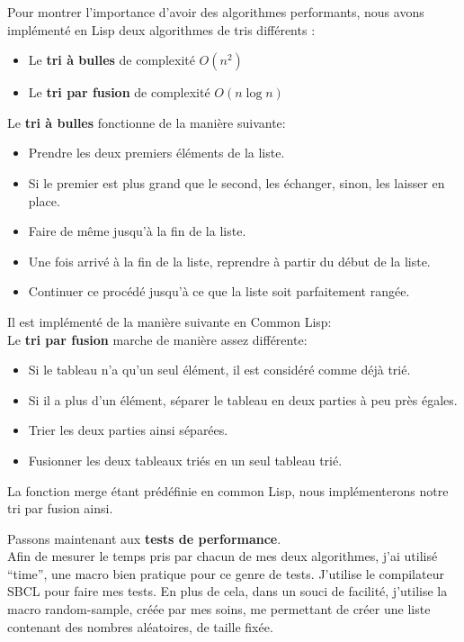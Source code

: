 \documentclass[a4paper, 12pt]{article}
\numberwithin{equation}{subsection}
\begin{document}
Pour montrer l'importance d'avoir des algorithmes performants, nous avons implémenté en Lisp deux algorithmes de tris différents : \\[0.2cm]
\begin{itemize}
  \item Le {\bf tri à bulles} de complexité {\bf $O(n^{2})$}
  \item Le {\bf tri par fusion} de complexité {\bf $O(n\log{n})$}\\
\end{itemize}
Le {\bf tri à bulles} fonctionne de la manière suivante:
\begin{itemize}
  \item Prendre les deux premiers éléments de la liste.
  \item Si le premier est plus grand que le second, les échanger, sinon, les laisser en place.
  \item Faire de même jusqu'à la fin de la liste.
  \item Une fois arrivé à la fin de la liste, reprendre à partir du début de la liste.
  \item Continuer ce procédé jusqu'à ce que la liste soit parfaitement rangée.\\[0.2cm]
\end{itemize}
Il est implémenté de la manière suivante en Common Lisp: \\[0.2cm]

Le {\bf tri par fusion} marche de manière assez différente:
\begin{itemize}
  \item Si le tableau n'a qu'un seul élément, il est considéré comme déjà trié.
  \item Si il a plus d'un élément, séparer le tableau en deux parties à peu près égales.
  \item Trier les deux parties ainsi séparées.
  \item Fusionner les deux tableaux triés en un seul tableau trié. \\[0.2cm]
\end{itemize}
La fonction merge étant prédéfinie en common Lisp, nous implémenterons notre tri par fusion ainsi.

Passons maintenant aux {\bf tests de performance}. \\

Afin de mesurer le temps pris par chacun de mes deux algorithmes, j'ai utilisé ``time'', une macro bien pratique pour ce genre de tests. J'utilise le compilateur SBCL pour faire mes tests. En plus de cela, dans un souci de facilité, j'utilise la macro random-sample, créée par mes soins, me permettant de créer une liste contenant des nombres aléatoires, de taille fixée. \\
\end{document}
